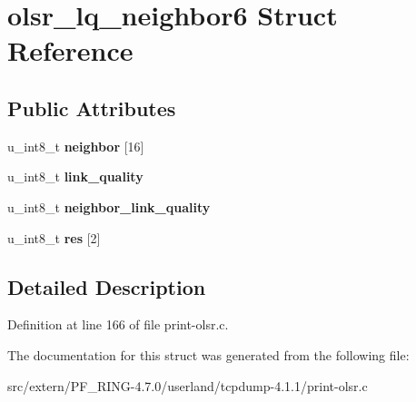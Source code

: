 \hypertarget{structolsr__lq__neighbor6}{
\section{olsr\_\-lq\_\-neighbor6 Struct Reference}
\label{structolsr__lq__neighbor6}
}
\subsection*{Public Attributes}
\begin{DoxyCompactItemize}
\item 
\hypertarget{structolsr__lq__neighbor6_ad745b83687f67c10e9783afcbe8d4266}{
u\_\-int8\_\-t {\bfseries neighbor} \mbox{[}16\mbox{]}}
\label{structolsr__lq__neighbor6_ad745b83687f67c10e9783afcbe8d4266}

\item 
\hypertarget{structolsr__lq__neighbor6_abacd8ce814dd9c4f3687b9a088326536}{
u\_\-int8\_\-t {\bfseries link\_\-quality}}
\label{structolsr__lq__neighbor6_abacd8ce814dd9c4f3687b9a088326536}

\item 
\hypertarget{structolsr__lq__neighbor6_a15399dbf6740d7c02d2bc8804b5dca73}{
u\_\-int8\_\-t {\bfseries neighbor\_\-link\_\-quality}}
\label{structolsr__lq__neighbor6_a15399dbf6740d7c02d2bc8804b5dca73}

\item 
\hypertarget{structolsr__lq__neighbor6_ac8c1e8e8c106d7fcfa4571762891e5e0}{
u\_\-int8\_\-t {\bfseries res} \mbox{[}2\mbox{]}}
\label{structolsr__lq__neighbor6_ac8c1e8e8c106d7fcfa4571762891e5e0}

\end{DoxyCompactItemize}


\subsection{Detailed Description}


Definition at line 166 of file print-\/olsr.c.



The documentation for this struct was generated from the following file:\begin{DoxyCompactItemize}
\item 
src/extern/PF\_\-RING-\/4.7.0/userland/tcpdump-\/4.1.1/print-\/olsr.c\end{DoxyCompactItemize}
